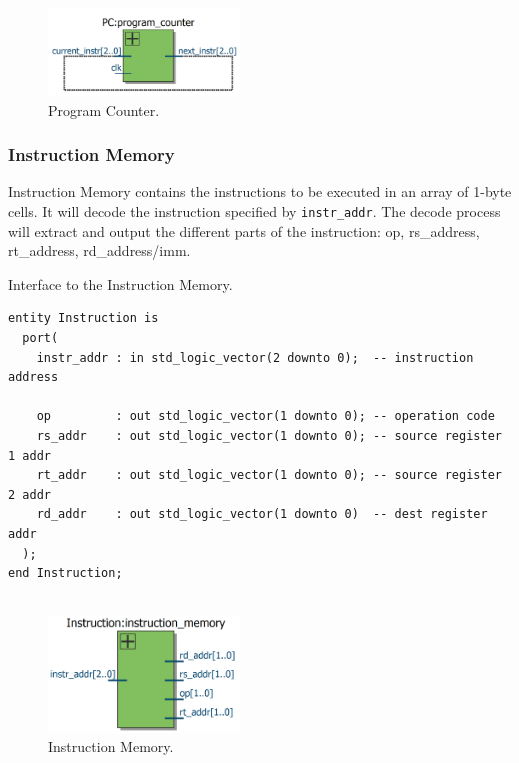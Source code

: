 \documentclass[a4paper, 11pt,oneside]{article}
\begin{document}
\begin{figure}[H]
	\begin{center}
	\includegraphics[width=2in]{pc.png}
	\caption{Program Counter.}
	\label{fig:pc} 
	\end{center}
\end{figure}

\subsubsection{Instruction Memory}
Instruction Memory contains the instructions to be executed in an array of 
1-byte cells. It will decode the instruction specified by 
\texttt{instr_addr}. The decode process will extract and output the 
different parts of the instruction: op, rs\_address, rt\_address, 
rd\_address/imm.

\begin{listing}[H]
\caption{Interface to the Instruction Memory.}
\label{code:im}
\begin{verbatim}
entity Instruction is
  port(
    instr_addr : in std_logic_vector(2 downto 0);  -- instruction address

    op         : out std_logic_vector(1 downto 0); -- operation code
    rs_addr    : out std_logic_vector(1 downto 0); -- source register 1 addr    
    rt_addr    : out std_logic_vector(1 downto 0); -- source register 2 addr
    rd_addr    : out std_logic_vector(1 downto 0)  -- dest register addr
  );
end Instruction;


\end{verbatim}
\end{listing}

\begin{figure}[H]
	\begin{center}
	\includegraphics[width=2in]{im.png}
	\caption{Instruction Memory.}
	\label{fig:im} 
	\end{center}
\end{figure}
\end{document}
